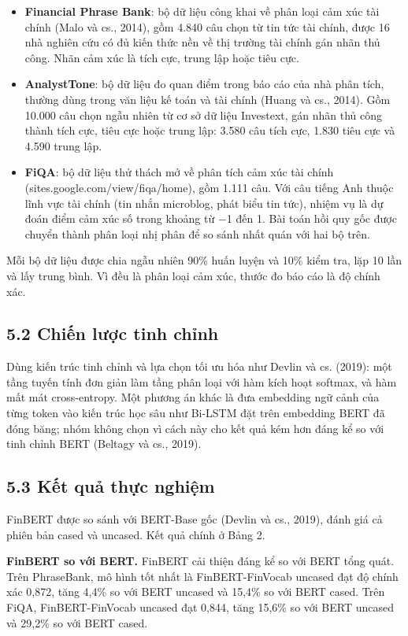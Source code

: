 \begin{itemize}
\item
  \textbf{Financial Phrase Bank}: bộ dữ liệu công khai về phân loại cảm xúc tài chính (Malo và cs., 2014), gồm 4.840 câu chọn từ tin tức tài chính, được 16 nhà nghiên cứu có đủ kiến thức nền về thị trường tài chính gán nhãn thủ công. Nhãn cảm xúc là tích cực, trung lập hoặc tiêu cực.
\item
  \textbf{AnalystTone}: bộ dữ liệu đo quan điểm trong báo cáo của nhà phân tích, thường dùng trong văn liệu kế toán và tài chính (Huang và cs., 2014). Gồm 10.000 câu chọn ngẫu nhiên từ cơ sở dữ liệu Investext, gán nhãn thủ công thành tích cực, tiêu cực hoặc trung lập: 3.580 câu tích cực, 1.830 tiêu cực và 4.590 trung lập.
\item
  \textbf{FiQA}: bộ dữ liệu thử thách mở về phân tích cảm xúc tài chính (sites.google.com/view/fiqa/home), gồm 1.111 câu. Với câu tiếng Anh thuộc lĩnh vực tài chính (tin nhắn microblog, phát biểu tin tức), nhiệm vụ là dự đoán điểm cảm xúc số trong khoảng từ \ensuremath{-}1 đến 1. Bài toán hồi quy gốc được chuyển thành phân loại nhị phân để so sánh nhất quán với hai bộ trên.
\end{itemize}

Mỗi bộ dữ liệu được chia ngẫu nhiên 90\% huấn luyện và 10\% kiểm tra, lặp 10 lần và lấy trung bình. Vì đều là phân loại cảm xúc, thước đo báo cáo là độ chính xác.

\subsection{5.2 Chiến lược tinh chỉnh}

Dùng kiến trúc tinh chỉnh và lựa chọn tối ưu hóa như Devlin và cs. (2019): một tầng tuyến tính đơn giản làm tầng phân loại với hàm kích hoạt softmax, và hàm mất mát cross-entropy. Một phương án khác là đưa embedding ngữ cảnh của từng token vào kiến trúc học sâu như Bi-LSTM đặt trên embedding BERT đã đóng băng; nhóm không chọn vì cách này cho kết quả kém hơn đáng kể so với tinh chỉnh BERT (Beltagy và cs., 2019).

\subsection{5.3 Kết quả thực nghiệm}

FinBERT được so sánh với BERT-Base gốc (Devlin và cs., 2019), đánh giá cả phiên bản cased và uncased. Kết quả chính ở Bảng 2.

\textbf{FinBERT so với BERT.} FinBERT cải thiện đáng kể so với BERT tổng quát. Trên PhraseBank, mô hình tốt nhất là FinBERT-FinVocab uncased đạt độ chính xác 0,872, tăng 4,4\% so với BERT uncased và 15,4\% so với BERT cased. Trên FiQA, FinBERT-FinVocab uncased đạt 0,844, tăng 15,6\% so với BERT uncased và 29,2\% so với BERT cased.

